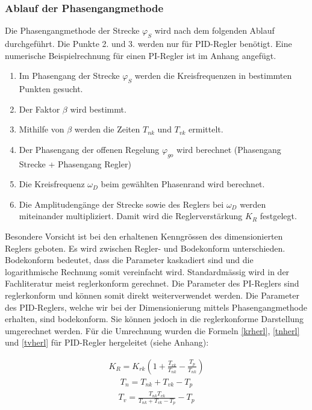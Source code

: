 \subsubsection{Ablauf der Phasengangmethode}
Die Phasengangmethode der Strecke $\varphi_S$ wird nach dem folgenden Ablauf durchgeführt. Die Punkte 2. und 3. werden nur für PID-Regler benötigt. Eine numerische Beispielrechnung für einen PI-Regler ist im Anhang angefügt.
\begin{enumerate}
\item Im Phasengang der Strecke $\varphi_S$ werden die Kreisfrequenzen in bestimmten Punkten gesucht.
\item Der Faktor $\beta$ wird bestimmt.
\item Mithilfe von $\beta$ werden die Zeiten $T_{nk}$ und $T_{vk}$ ermittelt.
\item Der Phasengang der offenen Regelung $\varphi_{go}$ wird berechnet (Phasengang Strecke + Phasengang Regler)
\item Die Kreisfrequenz $\omega_D$ beim gewählten Phasenrand wird berechnet.
\item Die Amplitudengänge der Strecke sowie des Reglers bei $\omega_D$ werden miteinander multipliziert. Damit wird die Reglerverstärkung $K_R$ festgelegt. 
\end{enumerate}

Besondere Vorsicht ist bei den erhaltenen Kenngrössen des dimensionierten Reglers geboten. Es wird zwischen Regler- und Bodekonform unterschieden. Bodekonform bedeutet, dass die Parameter kaskadiert sind und die logarithmische Rechnung somit vereinfacht wird. Standardmässig wird in der Fachliteratur meist reglerkonform gerechnet. Die Parameter des PI-Reglers sind reglerkonform und können somit direkt weiterverwendet werden. Die Parameter des PID-Reglers, welche wir bei der Dimensionierung mittels Phasengangmethode erhalten, sind bodekonform. Sie können jedoch in die reglerkonforme Darstellung umgerechnet werden. Für die Umrechnung wurden die Formeln \ref{krherl}, \ref{tnherl} und \ref{tvherl} für PID-Regler hergeleitet (siehe Anhang): \newline


\begin{align}
K_R=K_{rk}\left(1+\frac{T_{vk}}{T_{nk}}-\frac{T_p}{T_{nk}}\right)
\label{krherl}
\end{align}
\begin{align}
T_n=T_{nk}+T_{vk}-T_p
\label{tnherl}
\end{align}
\begin{align}
T_v=\frac{T_{nk}T_{vk}}{T_{nk}+T_{vk}-T_p}-T_p
\label{tvherl}
\end{align}\newline

